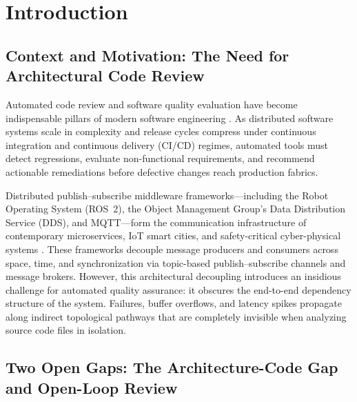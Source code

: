 \section{Introduction}
\label{sec:introduction}

\subsection{Context and Motivation: The Need for Architectural Code Review}
\label{sec:intro:context}

Automated code review and software quality evaluation have become indispensable pillars of modern software engineering \citep{tufano2022towards}. As distributed software systems scale in complexity and release cycles compress under continuous integration and continuous delivery (CI/CD) regimes, automated tools must detect regressions, evaluate non-functional requirements, and recommend actionable remediations before defective changes reach production fabrics.

Distributed publish--subscribe middleware frameworks---including the Robot Operating System (ROS~2), the Object Management Group's Data Distribution Service (DDS), and MQTT---form the communication infrastructure of contemporary microservices, IoT smart cities, and safety-critical cyber-physical systems \citep{lee2025probabilistic, lee2025dependency}. These frameworks decouple message producers and consumers across space, time, and synchronization via topic-based publish--subscribe channels and message brokers. However, this architectural decoupling introduces an insidious challenge for automated quality assurance: it obscures the end-to-end dependency structure of the system. Failures, buffer overflows, and latency spikes propagate along indirect topological pathways that are completely invisible when analyzing source code files in isolation.

\subsection{Two Open Gaps: The Architecture-Code Gap and Open-Loop Review}
\label{sec:intro:gaps}

